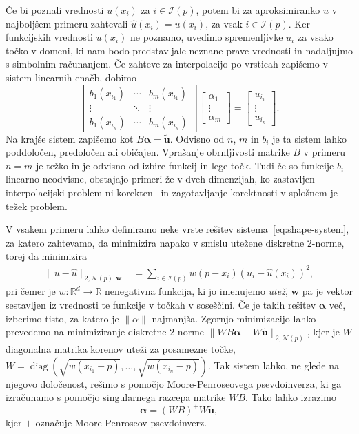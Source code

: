 \documentclass[12pt,a4paper,twoside]{article}
\theoremstyle{definition} %
\theoremstyle{plain} %
\numberwithin{equation}{section}
\newcommand{\R}{\mathbb R}
\newcommand{\Nc}{\mathcal{N}}
\newcommand{\I}{\mathcal{I}}
\renewcommand{\b}{\boldsymbol}
\newcommand{\uh}{\hat{u}}
\DeclareMathOperator{\diag}{diag}
\begin{document}
Če bi poznali vrednosti $u(x_i)$ za $i \in \I(p)$, potem bi za aproksimiranko
$\uh$ v najboljšem primeru zahtevali  $\hat{u}(x_i) = u(x_i)$, za vsak $i \in \I(p)$.
Ker funkcijskih vrednosti $u(x_i)$ ne poznamo, uvedimo spremenljivke $u_i$ za vsako točko v domeni,
ki nam bodo predstavljale neznane prave vrednosti in nadaljujmo s simbolnim računanjem.
Če zahteve za interpolacijo po vrsticah zapišemo v sistem linearnih enačb, dobimo
\begin{equation}
\begin{bmatrix}
  b_1(x_{i_1}) & \cdots & b_m(x_{i_1}) \\
  \vdots & \ddots & \vdots   \\
  b_1(x_{i_n}) & \cdots & b_m(x_{i_n})
\end{bmatrix}
\begin{bmatrix}
  \alpha_1 \\ \vdots \\ \alpha_m
\end{bmatrix}
=
\begin{bmatrix}
  u_{i_1} \\ \vdots \\ u_{i_n}
\end{bmatrix}.
  \label{eq:shape-system}
\end{equation}
Na krajše sistem zapišemo kot $B\b{\alpha} = \b{\tilde{u}}$. Odvisno od $n$, $m$ in $b_i$ je ta
sistem lahko poddoločen, predoločen ali običajen. Vprašanje obrnljivosti matrike $B$ v primeru $n=m$
je težko in je odvisno od izbire funkcij in lege točk. Tudi če so funkcije $b_i$ linearno neodvisne,
obstajajo primeri že v dveh dimenzijah, ko zastavljen interpolacijski problem ni
korekten~\cite[str.\ 79, izrek 2.2]{kozak2008numericna} in zagotavljanje korektnosti v splošnem je
težek problem.

V vsakem primeru lahko definiramo neke vrste rešitev sistema~\eqref{eq:shape-system},
za katero zahtevamo, da minimizira napako v smislu utežene diskretne 2-norme, torej da minimizira
\begin{align}
  \|u-\uh\|_{2, \Nc(p), \b{w}} &= \sum_{i\in \I(p)} w(p-x_i) (u_i - \uh(x_i))^2,
\end{align}
pri čemer je $w\colon\R^d\to\R$ nenegativna funkcija, ki jo imenujemo \emph{utež}, $\b{w}$ pa je
vektor sestavljen iz vrednosti te funkcije v točkah v soseščini.  Če je takih rešitev $\b \alpha$ več,
izberimo tisto, za katero je $\|\alpha\|$ najmanjša.  Zgornjo minimizacijo lahko prevedemo na
minimiziranje diskretne 2-norme $\|WB\b{\alpha}-W\b{\tilde{u}}\|_{2, \Nc(p)}$, kjer je $W$ diagonalna
matrika korenov uteži za posamezne točke, $W = \diag(\sqrt{w(x_{i_1}-p)}, \dots,
\sqrt{w(x_{i_n}-p)})$. Tak sistem lahko, ne glede na njegovo določenost, rešimo s pomočjo
Moore-Penroseovega psevdoinverza, ki ga izračunamo s pomočjo singularnega razcepa matrike $WB$.
Tako lahko izrazimo \[ \b{\alpha} = (WB)^{+}W\b{\tilde u}, \]
kjer $+$ označuje Moore-Penroseov psevdoinverz.
\end{document}
